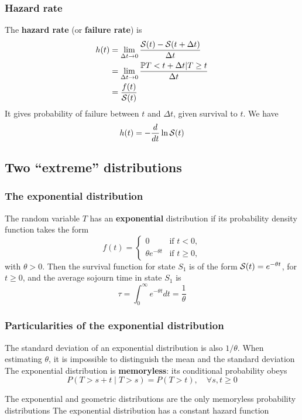 \documentclass[aspectratio=43]{beamer}
\begin{document}
\begin{frame}\frametitle{Hazard rate}
The \textbf{hazard rate} (or \textbf{failure rate}) is
\begin{align*}
h(t) &= \lim_{\Delta t\to 0}\frac{\S(t)-\S(t+\Delta t)}{\Delta t} \\
& = \lim_{\Delta t\to 0} \frac{\IP{ T<t+\Delta t | T\geq
t}}{\Delta t} \\
&= \frac{f(t)}{\S(t)}
\end{align*}
It gives probability of failure between $t$ and $\Delta t$, given survival to $t$.
\vfill
We have
\[
h(t)=-\frac{d}{dt}\ln\S(t)
\]
\end{frame}



\subsection{Two ``extreme'' distributions}

\begin{frame}\frametitle{The exponential distribution}
The random variable $T$ has an \textbf{exponential} distribution if its
probability density function takes the form
\begin{equation}\label{eq:exp_distrib}
f(t)=\begin{cases}0&\textrm{if }t<0,\\
\theta e^{-\theta t}&\textrm{if }t\geq 0,
\end{cases}
\end{equation}
with $\theta>0$. Then the
survival function for state $S_1$ is of the form $\S(t)=e^{-\theta
  t}$, for $t\geq 0$, and the average sojourn time in state $S_1$ is
\[
\tau=\int_0^\infty e^{-\theta t}dt=\frac 1\theta
\]
\end{frame}

\begin{frame}\frametitle{Particularities of the exponential distribution}
The standard deviation of an exponential distribution is also $1/\theta$. When estimating $\theta$, it is impossible to distinguish the mean and the standard deviation
\vfill
The exponential distribution is \textbf{memoryless}: its conditional probability obeys
\[
P(T > s + t\; |\; T > s) = P(T > t),\quad\forall s, t \ge 0
\]

The exponential and geometric distributions are the only memoryless probability distributions
\vfill
The exponential distribution has a constant hazard function
\end{frame}
\end{document}
